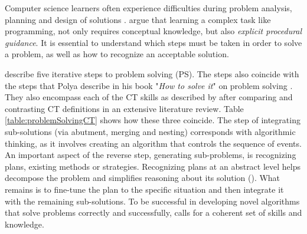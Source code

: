 Computer science learners often experience difficulties during problem analysis, planning and design of solutions \cite{Hazzan2011}.  argue that learning a complex task like programming, not only requires conceptual knowledge, but also \emph{explicit procedural guidance}. It is essential to understand which steps must be taken in order to solve a problem, as well as how to recognize an acceptable solution.


 describe five iterative steps to problem solving (PS). The steps also coincide with the steps that Polya describe in his book "\emph{How to solve it}" on problem solving \cite{polya2004solve}. They also encompass each of the CT skills as described by  after comparing and contrasting CT definitions in an extensive literature review.  Table \ref{table:problemSolvingCT} shows how these three coincide. The step of integrating sub-solutions (via abutment, merging and nesting) corresponds with algorithmic thinking, as it involves creating an algorithm that controls the sequence of events. An important aspect of the reverse step, generating sub-problems, is recognizing plans, existing methods or strategies. Recognizing plans at an abstract level helps decompose the problem and simplifies reasoning about its solution (\cite{Smetsers2017}). What remains is to fine-tune the plan to the specific situation and then integrate it with the remaining sub-solutions. To be successful in developing novel algorithms that solve problems correctly and successfully, calls for a coherent set of skills and knowledge.



